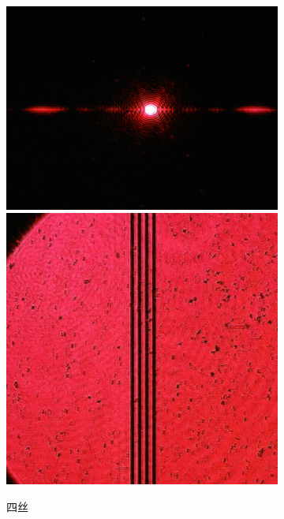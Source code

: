 \documentclass[a4paper]{article}
\begin{document}
\begin{figure}[htbp]
\begin{subfigure}[htbp]{0.3\textwidth}
        \includegraphics[width=\textwidth]{fre-done/3-7.JPG}
        \includegraphics[width=\textwidth]{img-done/3-7.JPG}
        \caption{四丝}
        \label{3-7}
    \end{subfigure}
    \begin{subfigure}[htbp]{0.3\textwidth}
        \centering

\end{subfigure}
\end{figure}
\end{document}
